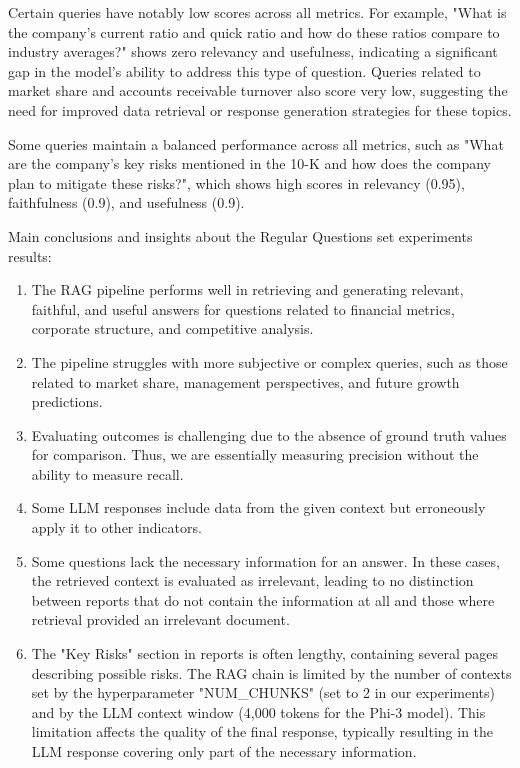 Certain queries have notably low scores across all metrics. For example, "What is the company's current ratio and quick ratio and how do these ratios compare to industry averages?" shows zero relevancy and usefulness, indicating a significant gap in the model's ability to address this type of question. Queries related to market share and accounts receivable turnover also score very low, suggesting the need for improved data retrieval or response generation strategies for these topics. 

Some queries maintain a balanced performance across all metrics, such as "What are the company's key risks mentioned in the 10-K and how does the company plan to mitigate these risks?", which shows high scores in relevancy (0.95), faithfulness (0.9), and usefulness (0.9).

Main conclusions and insights about the Regular Questions set experiments results:
\begin{enumerate}
\item The RAG pipeline performs well in retrieving and generating relevant, faithful, and useful answers for questions related to financial metrics, corporate structure, and competitive analysis.
\item The pipeline struggles with more subjective or complex queries, such as those related to market share, management perspectives, and future growth predictions.
\item Evaluating outcomes is challenging due to the absence of ground truth values for comparison. Thus, we are essentially measuring precision without the ability to measure recall.
\item Some LLM responses include data from the given context but erroneously apply it to other indicators.
\item Some questions lack the necessary information for an answer. In these cases, the retrieved context is evaluated as irrelevant, leading to no distinction between reports that do not contain the information at all and those where retrieval provided an irrelevant document.
\item The "Key Risks" section in reports is often lengthy, containing several pages describing possible risks. The RAG chain is limited by the number of contexts set by the hyperparameter "NUM\_CHUNKS" (set to 2 in our experiments) and by the LLM context window (4,000 tokens for the Phi-3 model). This limitation affects the quality of the final response, typically resulting in the LLM response covering only part of the necessary information.
\end{enumerate}

